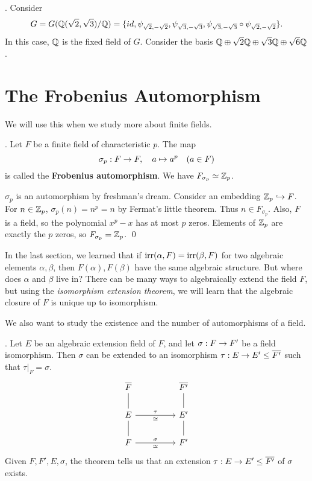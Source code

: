 \ex. Consider
\[
    G = G(\mathbb{Q}(\sqrt{2}, \sqrt{3})/\mathbb{Q}) = \{id, \psi_{\sqrt{2}, -\sqrt{2}}, \psi_{\sqrt{3}, -\sqrt{3}}, \psi_{\sqrt{3}, -\sqrt{3}} \circ \psi_{\sqrt{2}, -\sqrt{2}}\}.
\]
In this case, \(\mathbb{Q}\) is the fixed field of \(G\). Consider the basis \(\mathbb{Q} \oplus \sqrt{2} \mathbb{Q} \oplus \sqrt{3} \mathbb{Q} \oplus \sqrt{6}\mathbb{Q}\).

\section*{The Frobenius Automorphism}

We will use this when we study more about finite fields.

\thm.  Let \(F\) be a finite field of characteristic \(p\). The map
\[
    \sigma_p : F \rightarrow F, \quad a \mapsto a^p \quad (a \in F)
\]
is called the \textbf{Frobenius automorphism}. We have \(F_{\sigma_p} \simeq \mathbb{Z}_p\).

\pf \(\sigma_p\) is an automorphism by freshman's dream. Consider an embedding \(\mathbb{Z}_p \hookrightarrow F\). For \(n \in \mathbb{Z}_p\), \(\sigma_p(n) = n^p = n\) by Fermat's little theorem. Thus \(n \in F_{\sigma_p}\). Also, \(F\) is a field, so the polynomial \(x^p - x\) has at most \(p\) zeros. Elements of \(\mathbb{Z}_p\) are exactly the \(p\) zeros, so \(F_{\sigma_p} = \mathbb{Z}_p\). \qed


In the last section, we learned that if \(\mathrm{irr}(\alpha, F) = \mathrm{irr}(\beta, F)\) for two algebraic elements \(\alpha, \beta\), then \(F(\alpha), F(\beta)\) have the same algebraic structure. But where does \(\alpha\) and \(\beta\) live in? There can be many ways to algebraically extend the field \(F\), but using the \textit{isomorphism extension theorem}, we will learn that the algebraic closure of \(F\) is unique up to isomorphism.

We also want to study the existence and the number of automorphisms of a field.

\thm.  Let \(E\) be an algebraic extension field of \(F\), and let \(\sigma : F \rightarrow F'\) be a field isomorphism. Then \(\sigma\) can be extended to an isomorphism \(\tau : E \ra E' \leq \bar{F'}\) such that \(\tau|_F = \sigma\).
\[
    \begin{tikzcd}
        \bar{F} \arrow[dash]{d} & &\bar{F'} \arrow[dash]{d} \\
        E \arrow[dash]{d} \arrow{rr}{\tau}[swap]{\simeq} & & E' \arrow[dash]{d} \\
        F \arrow{rr}{\sigma}[swap]{\simeq} & & F'
    \end{tikzcd}
\]
Given \(F, F', E, \sigma\), the theorem tells us that an extension \(\tau : E \ra E' \leq \bar{F'}\) of \(\sigma\) exists.

